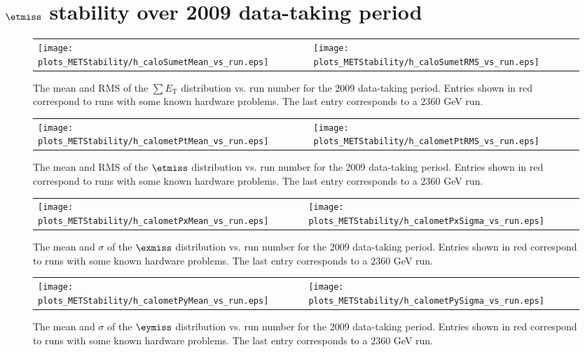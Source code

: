 \section{$\etmiss$ stability over 2009 data-taking period}

\begin{figure}[h!]
 \centering
 \begin{tabular}{ll}
  \texttt{[image: plots\_METStability/h\_caloSumetMean\_vs\_run.eps]} &
  \texttt{[image: plots\_METStability/h\_caloSumetRMS\_vs\_run.eps]} \\
 \end{tabular}
 \caption{\small The mean and RMS of the $\sum E_\text{T}$ distribution vs. run number for the 2009 data-taking period.
          Entries shown in red correspond to runs with some known hardware problems. The last entry corresponds to a $2360$ GeV run.
          \label{fig:SumET_vs_run}}
\end{figure}

\begin{figure}[h!]
 \centering
 \begin{tabular}{ll}
  \texttt{[image: plots\_METStability/h\_calometPtMean\_vs\_run.eps]} &
  \texttt{[image: plots\_METStability/h\_calometPtRMS\_vs\_run.eps]} \\
 \end{tabular}
 \caption{\small The mean and RMS of the $\etmiss$ distribution vs. run number for the 2009 data-taking period.
          Entries shown in red correspond to runs with some known hardware problems. The last entry corresponds to a $2360$ GeV run.\label{fig:MET_vs_run}}
\end{figure}

\begin{figure}[h!]
 \centering
 \begin{tabular}{ll}
  \texttt{[image: plots\_METStability/h\_calometPxMean\_vs\_run.eps]} &
  \texttt{[image: plots\_METStability/h\_calometPxSigma\_vs\_run.eps]} \\
 \end{tabular}
 \caption{\small The mean and $\sigma$ of the $\exmiss$ distribution vs. run number for the 2009 data-taking period.
          Entries shown in red correspond to runs with some known hardware problems. The last entry corresponds to a $2360$ GeV run.\label{fig:MEx_vs_run}}
\end{figure}

\begin{figure}[h!]
 \centering
 \begin{tabular}{ll}
  \texttt{[image: plots\_METStability/h\_calometPyMean\_vs\_run.eps]} &
  \texttt{[image: plots\_METStability/h\_calometPySigma\_vs\_run.eps]} \\
 \end{tabular}
 \caption{\small The mean and $\sigma$ of the $\eymiss$ distribution vs. run number for the 2009 data-taking period.
          Entries shown in red correspond to runs with some known hardware problems. The last entry corresponds to a $2360$ GeV run.\label{fig:MEy_vs_run}}
\end{figure}

\clearpage
